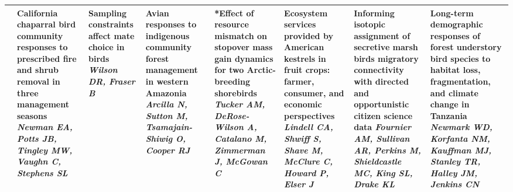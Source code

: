 \begin{tabular}{|x{0.85cm}|x{2.85cm}|x{2.85cm}|x{2.85cm}|x{2.85cm}|a{2.85cm}|a{2.85cm}|a{2.85cm}|}
&California chaparral bird community responses to prescribed fire and shrub removal in three management seasons \newline \newline \textit{Newman EA, Potts JB, Tingley MW, Vaughn C, Stephens SL} & Sampling constraints affect mate choice in birds \newline \newline \textit{Wilson DR, Fraser B} & Avian responses to indigenous community forest management in western Amazonia \newline \newline \textit{Arcilla N, Sutton M, Tsamajain-Shiwig O, Cooper RJ} & *Effect of resource mismatch on stopover mass gain dynamics for two Arctic-breeding shorebirds \newline \newline \textit{Tucker AM, DeRose-Wilson A, Catalano M, Zimmerman J, McGowan C} & Ecosystem services provided by American kestrels in fruit crops: farmer, consumer, and economic perspectives \newline \newline \textit{Lindell CA, Shwiff S, Shave M, McClure C, Howard P, Elser J} & Informing isotopic assignment of secretive marsh birds migratory connectivity with directed and opportunistic citizen science data \newline \newline \textit{Fournier AM, Sullivan AR, Perkins M, Shieldcastle MC, King SL, Drake KL} & Long-term demographic responses of forest understory bird species to habitat loss, fragmentation, and climate change in Tanzania \newline \newline \textit{Newmark WD, Korfanta NM, Kauffman MJ, Stanley TR, Halley JM, Jenkins CN}\\
\hline

\end{tabular}
